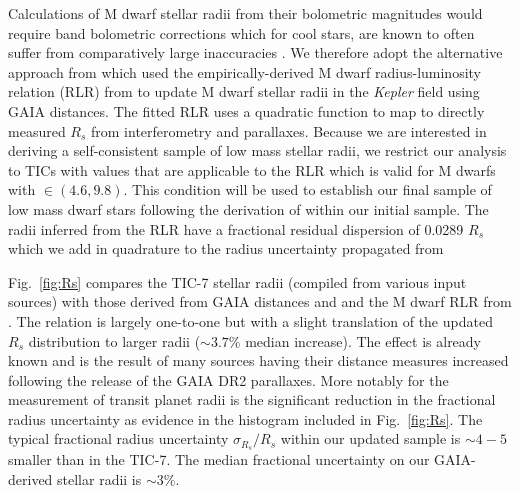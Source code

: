 Calculations of M dwarf stellar radii from their bolometric magnitudes would require \Ks{-}band bolometric
corrections which for cool stars, are known to often suffer from comparatively large inaccuracies 
\citep[\teff{} $\lesssim 4100$ K;][]{berger18}. We therefore adopt the alternative approach from
\cite{berger18} which used the empirically-derived M dwarf radius-luminosity relation (RLR) from
\cite{mann15} to update M dwarf stellar radii in the \emph{Kepler} field using GAIA distances.
The fitted RLR uses a quadratic function to map
\MK{} to directly measured $R_s$ from interferometry and parallaxes. Because we are interested in deriving a
self-consistent sample of low mass stellar radii, we restrict our
analysis to TICs with \MK{} values that are applicable to the \cite{mann15} RLR which
is valid for M dwarfs with \MK{} $\in (4.6,9.8)$. This condition will be used to establish our final
sample of low mass dwarf stars following the derivation of \teff{} within our initial sample.
The radii inferred from the RLR have a fractional residual dispersion of 0.0289 $R_s$ which we add
in quadrature to the radius uncertainty propagated from  

Fig.~\ref{fig:Rs} compares the TIC-7 stellar radii (compiled from various input sources) with those
derived from GAIA distances and and the M dwarf RLR from \cite{mann15}. The relation is largely one-to-one
but with a slight translation of the updated $R_s$ distribution to larger radii ($\sim 3.7$\% median increase).
The effect is already known \citep{berger18} and is the result of many sources having their distance
measures increased following the release of the GAIA DR2 parallaxes. More notably for the measurement of
transit planet radii is the significant reduction in the fractional radius uncertainty as evidence in the
histogram included in Fig.~\ref{fig:Rs}. The typical fractional radius uncertainty $\sigma_{R_{s}}/R_s$ within
our updated sample is $\sim 4-5$ smaller than in the TIC-7. The median fractional uncertainty on our
GAIA-derived stellar radii is $\sim 3$\%.

